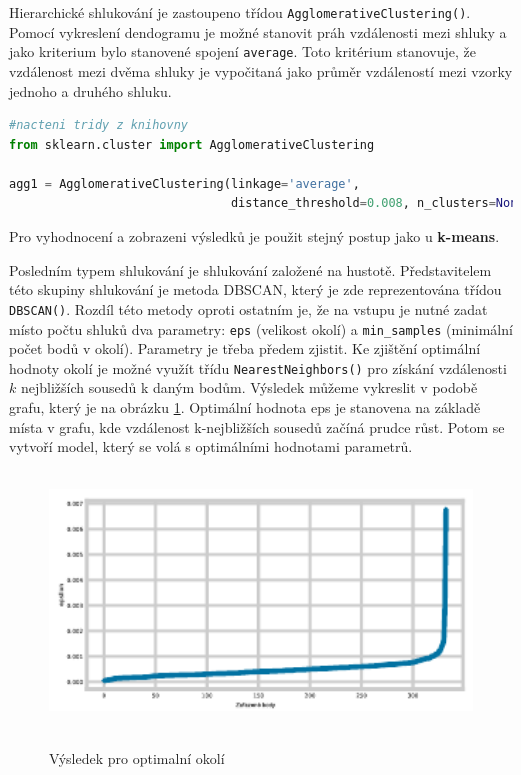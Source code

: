 Hierarchické shlukování je zastoupeno třídou \verb|AgglomerativeClustering()|. Pomocí vykreslení dendogramu je možné stanovit práh vzdálenosti mezi shluky a jako kriterium bylo stanovené spojení \verb|average|. Toto kritérium stanovuje, že vzdálenost mezi dvěma shluky je vypočitaná jako průměr vzdáleností mezi vzorky jednoho a druhého shluku.

\begin{mdframed}
\begin{lstlisting}[language=Python]
#nacteni tridy z knihovny
from sklearn.cluster import AgglomerativeClustering

agg1 = AgglomerativeClustering(linkage='average', 
                               distance_threshold=0.008, n_clusters=None)
\end{lstlisting}   
\end{mdframed}
Pro vyhodnocení a zobrazeni výsledků je použit stejný postup jako u \textbf{k-means}. 

Posledním typem shlukování je shlukování založené na hustotě. Představitelem této skupiny shlukování je metoda DBSCAN, který je zde reprezentována třídou \verb|DBSCAN()|. Rozdíl této metody oproti ostatním je, že na vstupu je nutné zadat místo počtu shluků dva parametry: \verb|eps| (velikost okolí) a \verb|min_samples| (minimální počet bodů v okolí). Parametry je třeba předem zjistit. Ke zjištění optimální hodnoty okolí je možné využít třídu \verb|NearestNeighbors()| pro získání vzdálenosti $k$ nejbližších sousedů k daným bodům. Výsledek můžeme vykreslit v podobě grafu, který je na obrázku \ref{epsilon}. Optimální hodnota eps je stanovena na základě místa v grafu, kde vzdálenost k-nejbližších sousedů začíná prudce růst. Potom se vytvoří model, který se volá s optimálními hodnotami parametrů. 

\begin{figure}[h]\centering
  \centering
  \includegraphics[width=\textwidth,height=2.7in]{obrazky/epsilon-db.pdf}\\[1pt]
  \caption{Výsledek pro optimalní okolí}
  \label{epsilon}
\end{figure}

